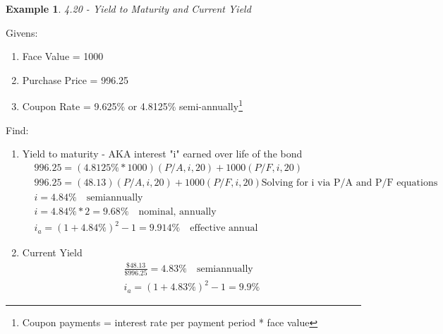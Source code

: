 \documentclass{report} %
\newtheorem{exmp}{Example}
\begin{document}
\begin{exmp}
    4.20 - Yield to Maturity and Current Yield
\end{exmp}
Givens:
\begin{enumerate}
    \item Face Value = 1000
    \item Purchase Price = 996.25
    \item Coupon Rate = 9.625\% or 4.8125\% semi-annually\footnote{Coupon payments  = interest rate per payment period * face value}
\end{enumerate}
Find: 
\begin{enumerate}
    \item Yield to maturity - AKA interest "i" earned over life of the bond
    \begin{equation*}
        \begin{aligned}
            &996.25 =(4.8125\% *  1000) (P/A,i,20) + 1000(P/F,i,20)\\
            &996.25 =(48.13)(P/A,i,20) + 1000(P/F,i,20) \text{Solving for i via P/A and P/F equations}\\ 
            &i = 4.84\% \quad \text{semiannually} \\ %
            &i = 4.84\% * 2 = 9.68\% \quad \text{nominal, annually} \\
            &i_a = (1+4.84\%)^2-1 = 9.914\% \quad \text{effective annual}
        \end{aligned}
    \end{equation*}
    \item Current Yield
    \begin{equation*}
        \begin{aligned}
            \frac{\$48.13}{\$996.25} = 4.83\% \quad \text{semiannually} \\
            i_a = (1+4.83\%)^2-1 = 9.9\% 
        \end{aligned}
    \end{equation*}
\end{enumerate}
\end{document}
